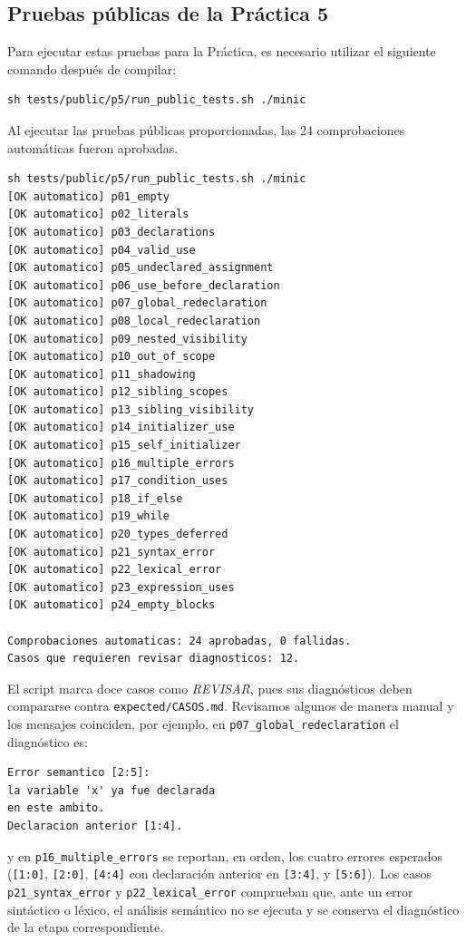 \documentclass[12pt,letterpaper]{article}
\begin{document}
\subsection*{Pruebas públicas de la Práctica 5}

Para ejecutar estas pruebas para la Práctica, es necesario utilizar el siguiente comando después de compilar:
\begin{verbatim}
sh tests/public/p5/run_public_tests.sh ./minic
\end{verbatim}

Al ejecutar las pruebas públicas proporcionadas, las 24 comprobaciones automáticas fueron aprobadas.

\begin{verbatim}
sh tests/public/p5/run_public_tests.sh ./minic
[OK automatico] p01_empty
[OK automatico] p02_literals
[OK automatico] p03_declarations
[OK automatico] p04_valid_use
[OK automatico] p05_undeclared_assignment
[OK automatico] p06_use_before_declaration
[OK automatico] p07_global_redeclaration
[OK automatico] p08_local_redeclaration
[OK automatico] p09_nested_visibility
[OK automatico] p10_out_of_scope
[OK automatico] p11_shadowing
[OK automatico] p12_sibling_scopes
[OK automatico] p13_sibling_visibility
[OK automatico] p14_initializer_use
[OK automatico] p15_self_initializer
[OK automatico] p16_multiple_errors
[OK automatico] p17_condition_uses
[OK automatico] p18_if_else
[OK automatico] p19_while
[OK automatico] p20_types_deferred
[OK automatico] p21_syntax_error
[OK automatico] p22_lexical_error
[OK automatico] p23_expression_uses
[OK automatico] p24_empty_blocks

Comprobaciones automaticas: 24 aprobadas, 0 fallidas.
Casos que requieren revisar diagnosticos: 12.
\end{verbatim}

El script marca doce casos como \emph{REVISAR}, pues sus diagnósticos deben compararse contra
\texttt{expected/CASOS.md}. Revisamos algunos de manera manual y los mensajes coinciden, por ejemplo, en
\texttt{p07\_global\_redeclaration} el diagnóstico es:

\begin{verbatim}
Error semantico [2:5]:
la variable 'x' ya fue declarada
en este ambito.
Declaracion anterior [1:4].
\end{verbatim}

y en \texttt{p16\_multiple\_errors} se reportan, en orden, los cuatro errores esperados (\texttt{[1:0]},
\texttt{[2:0]}, \texttt{[4:4]} con declaración anterior en \texttt{[3:4]}, y \texttt{[5:6]}). Los casos
\texttt{p21\_syntax\_error} y \texttt{p22\_lexical\_error} comprueban que, ante un error sintáctico o léxico,
el análisis semántico no se ejecuta y se conserva el diagnóstico de la etapa correspondiente.
\end{document}
